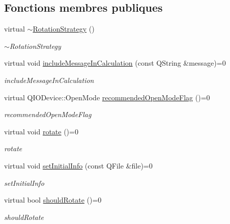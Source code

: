 \subsection*{Fonctions membres publiques}
\begin{DoxyCompactItemize}
\item 
virtual \hyperlink{classQsLogging_1_1RotationStrategy_abd4b37978f48a3c75caa46ee9456b506}{$\sim$\-Rotation\-Strategy} ()
\begin{DoxyCompactList}\small\item\em $\sim$\-Rotation\-Strategy \end{DoxyCompactList}\item 
virtual void \hyperlink{classQsLogging_1_1RotationStrategy_a66041e701c257840d3b58ec2fc22c115}{include\-Message\-In\-Calculation} (const Q\-String \&message)=0
\begin{DoxyCompactList}\small\item\em include\-Message\-In\-Calculation \end{DoxyCompactList}\item 
virtual Q\-I\-O\-Device\-::\-Open\-Mode \hyperlink{classQsLogging_1_1RotationStrategy_a8179129cae134717d4483c1903de3bdf}{recommended\-Open\-Mode\-Flag} ()=0
\begin{DoxyCompactList}\small\item\em recommended\-Open\-Mode\-Flag \end{DoxyCompactList}\item 
virtual void \hyperlink{classQsLogging_1_1RotationStrategy_a11bc6e7d8af7df658f15abb69b3cc294}{rotate} ()=0
\begin{DoxyCompactList}\small\item\em rotate \end{DoxyCompactList}\item 
virtual void \hyperlink{classQsLogging_1_1RotationStrategy_adde9d4dcbca113233438beb43bab7f89}{set\-Initial\-Info} (const Q\-File \&file)=0
\begin{DoxyCompactList}\small\item\em set\-Initial\-Info \end{DoxyCompactList}\item 
virtual bool \hyperlink{classQsLogging_1_1RotationStrategy_a53136a1009e8a0b30956ea83c43c4973}{should\-Rotate} ()=0
\begin{DoxyCompactList}\small\item\em should\-Rotate \end{DoxyCompactList}\end{DoxyCompactItemize}


